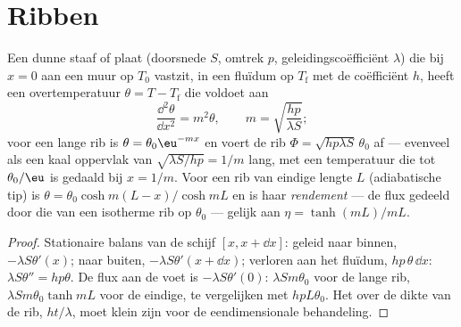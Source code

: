 \section{Ribben}

\begin{proposition}[De koelrib]\label{prop:b2:heat-conduction:fin}
Een dunne staaf of plaat (doorsnede $S$, omtrek $p$, geleidingscoëfficiënt
$\lambda$)
die bij $x = 0$ aan een muur op $T_0$ vastzit, in een fluïdum op $T_{\text{f}}$ met
de coëfficiënt $h$, heeft een overtemperatuur $\theta = T - T_{\text{f}}$
die voldoet aan
\[
\frac{\dd^2\theta}{\dd x^2} = m^2\theta, \qquad m = \sqrt{\frac{hp}{\lambda S}} ;
\]
voor een lange rib is $\theta = \theta_0\eu^{-mx}$ en voert de rib
$\Phi =
\sqrt{hp\lambda S}\,\theta_0$ af --- evenveel als een kaal oppervlak
van $\sqrt{\lambda
S/hp} = 1/m$ lang, met een temperatuur die tot
$\theta_0/\eu$ is gedaald bij $x = 1/m$. Voor een rib van eindige lengte $L$
(adiabatische tip) is $\theta =
\theta_0\cosh m(L-x)/\cosh mL$ en is haar
\emph{rendement} --- de flux gedeeld door die van een isotherme rib op $\theta_0$ ---
gelijk aan $\eta = \tanh(mL)/mL$.
\end{proposition}

\begin{proof}
Stationaire balans van de schijf $[x, x + \dd x]$: geleid naar binnen,
$-\lambda S\theta'(x)$; naar buiten, $-\lambda S\theta'(x + \dd x)$;
verloren aan het
fluïdum, $hp\,\theta\,\dd x$: $\lambda S\theta'' = hp\theta$. De flux aan de
voet is $-\lambda S\theta'(0)$: $\lambda Sm\theta_0$ voor de lange rib,
$\lambda Sm\theta_0\tanh mL$ voor de eindige, te vergelijken met
$hpL\theta_0$. Het  over de dikte van de rib, $ht/\lambda$, moet
klein zijn voor de eendimensionale behandeling.
\end{proof}

